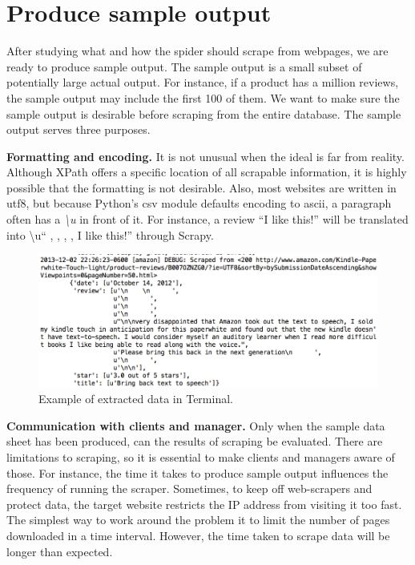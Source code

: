 \documentclass[12pt,twoside,draft]{report}
\begin{document}
\section{Produce sample output}

After studying what and how the spider should scrape from webpages, we are ready to produce sample output. The sample output is a small subset of potentially large actual output. For instance, if a product has a million reviews, the sample output may include the first 100 of them. We want to make sure the sample output is desirable before scraping from the entire database. The sample output serves three purposes.

\textbf{Formatting and encoding.} It is not unusual when the ideal is far from reality. Although XPath offers a specific location of all scrapable information, it is highly possible that the formatting is not desirable. Also, most websites are written in \gls{utf8}, but because Python's csv module defaults encoding to ascii, a paragraph often has a \textit{\textbackslash u} in front of it. For instance, a review ``I like this!'' will be translated into \textbackslash u``   ,    ,    ,   , I like this!'' through Scrapy.

\begin{figure}[htp]
\includegraphics[width=\textwidth]{scrapy_screenshot_terminal.png}
\caption[Scrapy screenshot in Mac Terminal]
{Example of extracted data in Terminal.}
\end{figure}

\textbf{Communication with clients and manager.} Only when the sample data sheet has been produced, can the results of scraping be evaluated. There are limitations to scraping, so it is essential to make clients and managers aware of those. For instance, the time it takes to produce sample output influences the frequency of running the scraper. Sometimes, to keep off web-scrapers and protect data, the target website restricts the IP address from visiting it too fast. The simplest way to work around the problem it to limit the number of pages downloaded in a time interval. However, the time taken to scrape data will be longer than expected.
\end{document}
